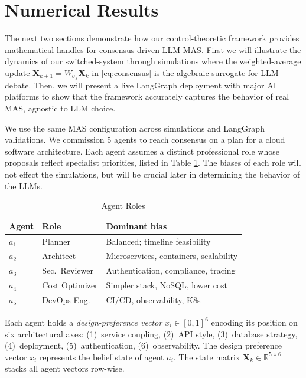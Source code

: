 \documentclass[journal,twoside,web]{ieeecolor_no_firstpage_logo}
\begin{document}
\section{Numerical Results}
The next two sections demonstrate how our control-theoretic framework provides mathematical handles for consensus-driven LLM-MAS. First we will illustrate the dynamics of our switched-system through simulations where the weighted-average update $\mathbf{X}_{k+1}=W_{\sigma_k}\mathbf{X}_k$ in \eqref{eq:consensus} is the
algebraic surrogate for LLM debate. Then, we will present a live LangGraph deployment with major AI platforms to show that the framework accurately captures the behavior of real MAS, agnostic to LLM choice.  

We use the same MAS configuration across simulations and LangGraph validations. We commission 5 agents to reach consensus on a plan for a cloud software architecture. Each agent assumes a distinct professional role whose proposals reflect specialist priorities, listed in Table \ref{tab:roles}. The biases of each role will not effect the simulations, but will be crucial later in determining the behavior of the LLMs.
\begin{table}[h]
\centering
\caption{Agent Roles}
\label{tab:roles}
\begin{tabular}{@{}lll@{}}
\toprule
Agent & Role & Dominant bias \\
\midrule
$a_1$ & Planner       & Balanced; timeline feasibility \\
$a_2$ & Architect     & Microservices, containers, scalability \\
$a_3$ & Sec.\ Reviewer & Authentication, compliance, tracing \\
$a_4$ & Cost Optimizer & Simpler stack, NoSQL, lower cost \\
$a_5$ & DevOps Eng.   & CI/CD, observability, K8s \\
\bottomrule
\end{tabular}
\end{table}
\noindent
Each agent holds a \emph{design-preference vector}
$x_i\in[0,1]^6$ encoding its position on six architectural
axes: (1)~service coupling, (2)~API style, (3)~database strategy,
(4)~deployment, (5)~authentication, (6)~observability. The design preference vector $x_i$ represents the belief state of agent $a_i$.
The state matrix $\mathbf{X}_k\in\mathbb{R}^{5\times6}$ stacks all agent vectors
row-wise.
\end{document}
